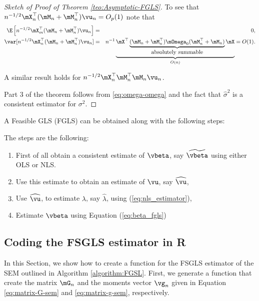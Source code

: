 \documentclass[english,12pt]{book}\usepackage[]{graphicx}\usepackage[]{xcolor}
\begin{document}
\begin{proof}[Sketch of Proof of Theorem \ref{teo:Asymptotic-FGLS}]
To see that $n^{-1/2}\mX^\top_n(\mM_n + \mM^\top_n)\vu_n = O_p(1)$ note that
\begin{eqnarray*}
\E\left[n^{-1/2}\mX^\top_m(\mM_n + \mM^\top_n)\vu_n\right] &=& 0, \\
\var[n^{-1/2}\mX^\top_n(\mM_n + \mM^\top_n)\vu_n] &=& n^{-1}\underbrace{\mX^\top\underbrace{(\mM_n + \mM^\top_n)\mOmega_0(\mM^\top_n + \mM_n)}_{\mbox{absolutely summable}}\mX}_{O(n)} = O(1).
\end{eqnarray*}

A similar result holds for $n^{-1/2}\mX^\top_n\mM^\top_n\mM_n\vu_n$.

Part 3 of the theorem follows from \eqref{eq:omega-omega} and the fact that $\widehat{\sigma}^2$ is a consistent estimator for $\sigma^2$.
\end{proof}


A Feasible GLS (FGLS) can be obtained along with the following steps:

\begin{algorithm}\label{algorithm:FGSL}
The steps are the following:

\begin{enumerate}
  \item First of all obtain a consistent estimate of $\vbeta$, say $\widetilde{\vbeta}$ using either OLS or NLS.
  \item Use this estimate to obtain an estimate of $\vu$, say $\widehat{\vu}$,
  \item Use $\widehat{\vu}$, to estimate $\lambda$, say $\widehat{\lambda}$, using (\ref{eq:nls_estimator}),
  \item Estimate $\vbeta$ using Equation (\ref{eq:beta_fgls})
\end{enumerate}
\end{algorithm}


\subsection{Coding the FSGLS estimator in R}

In this Section, we show how to create a function for the FSGLS estimator of the SEM outlined in Algorithm \ref{algorithm:FGSL}. First, we generate a function that create the matrix $\mG_n$ and the moments vector $\vg_n$ given in Equation \eqref{eq:matrix-G-sem} and \eqref{eq:matrix-g-sem}, respectively. 
\end{document}
